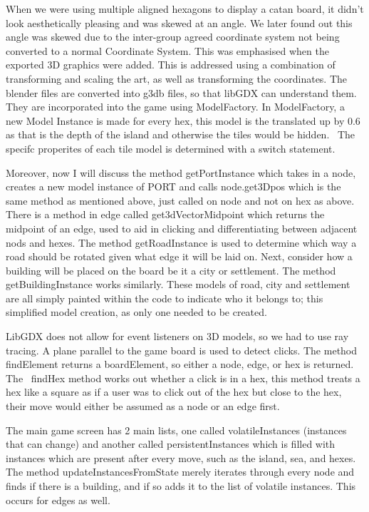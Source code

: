 \documentclass[a4paper,doc]{apa6}
\begin{document}
When we were using multiple aligned hexagons to display a catan board, it didn’t look aesthetically pleasing and was skewed at an angle. We later found out this angle was skewed due to the inter-group agreed coordinate system not being converted to a normal Coordinate System. This was emphasised when the exported 3D graphics were added. This is addressed using a combination of transforming and scaling the art, as well as transforming the coordinates. The blender files are converted into g3db files, so that libGDX can understand them. They are incorporated into the game using ModelFactory. In ModelFactory, a new Model Instance is made for every hex, this model is the translated up by 0.6 as that is the depth of the island and otherwise the tiles would be hidden.  The specifc properites of each tile model is determined with a switch statement. 

Moreover, now I will discuss the method getPortInstance which takes in a node, creates a new model instance of PORT and calls node.get3Dpos which is the same method as mentioned above, just called on node and not on hex as above. There is a method in edge called get3dVectorMidpoint which returns the midpoint of an edge, used to aid in clicking and differentiating between adjacent nods and hexes. The method getRoadInstance is used to determine which way a road should be rotated given what edge it will be laid on. Next, consider how a building will be placed on the board be it a city or settlement. The method getBuildingInstance works similarly. These models of road, city and settlement are all simply painted within the code to indicate who it belongs to; this simplified model creation, as only one needed to be created. 

LibGDX does not allow for event listeners on 3D models, so we had to use ray tracing. A plane parallel to the game board is used to detect clicks. The method findElement returns a boardElement, so either a node, edge, or hex is returned. The  findHex method works out whether a click is in a hex, this method treats a hex like a square as if a user was to click out of the hex but close to the hex, their move would either be assumed as a node or an edge first. 

The main game screen has 2 main lists, one called volatileInstances (instances that can change) and another called persistentInstances which is filled with instances which are present after every move, such as the island, sea, and hexes. The method updateInstancesFromState merely iterates through every node and finds if there is a building, and if so adds it to the list of volatile instances. This occurs for edges as well. 
\end{document}

